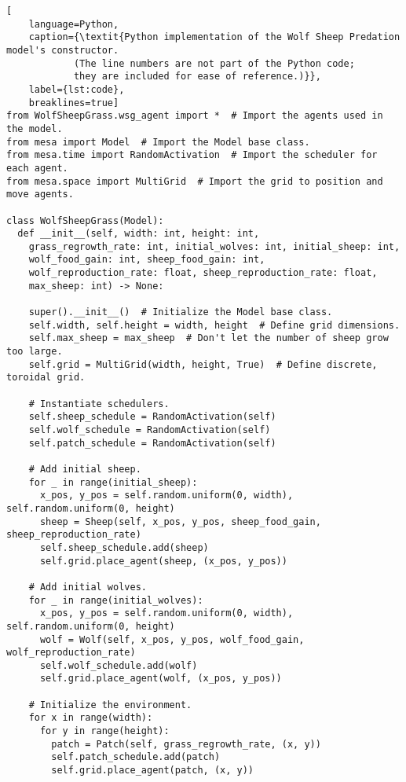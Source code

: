 \begin{lstlisting}[
    language=Python,
    caption={\textit{Python implementation of the Wolf Sheep Predation model's constructor.
            (The line numbers are not part of the Python code;
            they are included for ease of reference.)}},
    label={lst:code},
    breaklines=true]
from WolfSheepGrass.wsg_agent import *  # Import the agents used in the model.
from mesa import Model  # Import the Model base class.
from mesa.time import RandomActivation  # Import the scheduler for each agent.
from mesa.space import MultiGrid  # Import the grid to position and move agents.

class WolfSheepGrass(Model):
  def __init__(self, width: int, height: int,
    grass_regrowth_rate: int, initial_wolves: int, initial_sheep: int,
    wolf_food_gain: int, sheep_food_gain: int,
    wolf_reproduction_rate: float, sheep_reproduction_rate: float,
    max_sheep: int) -> None:

    super().__init__()  # Initialize the Model base class.
    self.width, self.height = width, height  # Define grid dimensions.
    self.max_sheep = max_sheep  # Don't let the number of sheep grow too large.
    self.grid = MultiGrid(width, height, True)  # Define discrete, toroidal grid.

    # Instantiate schedulers.
    self.sheep_schedule = RandomActivation(self)
    self.wolf_schedule = RandomActivation(self)
    self.patch_schedule = RandomActivation(self)

    # Add initial sheep.
    for _ in range(initial_sheep):
      x_pos, y_pos = self.random.uniform(0, width), self.random.uniform(0, height)
      sheep = Sheep(self, x_pos, y_pos, sheep_food_gain, sheep_reproduction_rate)
      self.sheep_schedule.add(sheep)
      self.grid.place_agent(sheep, (x_pos, y_pos))

    # Add initial wolves.
    for _ in range(initial_wolves):
      x_pos, y_pos = self.random.uniform(0, width), self.random.uniform(0, height)
      wolf = Wolf(self, x_pos, y_pos, wolf_food_gain, wolf_reproduction_rate)
      self.wolf_schedule.add(wolf)
      self.grid.place_agent(wolf, (x_pos, y_pos))

    # Initialize the environment.
    for x in range(width):
      for y in range(height):
        patch = Patch(self, grass_regrowth_rate, (x, y))
        self.patch_schedule.add(patch)
        self.grid.place_agent(patch, (x, y))
\end{lstlisting}
